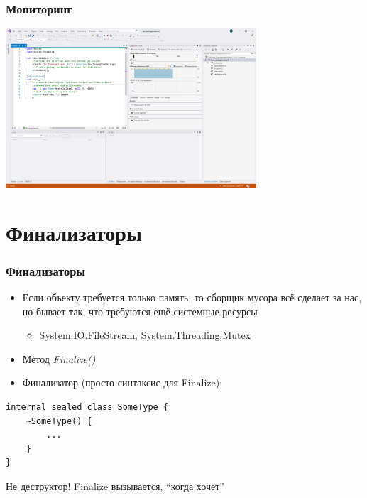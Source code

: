 \documentclass[xetex,mathserif,serif]{beamer}
\begin{document}
    \begin{frame}[fragile]
        \frametitle{Мониторинг}
        \begin{center}
            \includegraphics[width=0.7\textwidth]{vsMonitoring.png}
        \end{center}
    \end{frame}

    \section{Финализаторы}

    \begin{frame}[fragile]
        \frametitle{Финализаторы}
        \begin{itemize}
            \item Если объекту требуется только память, то сборщик мусора всё сделает за нас, но бывает так, что требуются ещё системные ресурсы
            \begin{itemize}
                \item System.IO.FileStream, System.Threading.Mutex
            \end{itemize}
            \item Метод \textit{Finalize()}
            \item Финализатор (просто синтаксис для Finalize):
        \end{itemize}
        \begin{footnotesize}
            \begin{verbatim}
internal sealed class SomeType {
    ~SomeType() {
        ...
    }
}
            \end{verbatim}
        \end{footnotesize}
        Не деструктор! Finalize вызывается, ``когда хочет''
    \end{frame}
\end{document}

